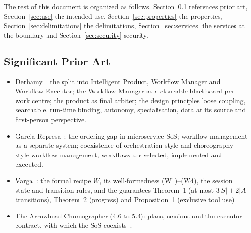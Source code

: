 \documentclass[a4paper]{arrowhead}
\begin{document}
The rest of this document is organized as follows. Section~\ref{sec:prior_art} references prior art,
Section~\ref{sec:use} the intended use, Section~\ref{sec:properties} the properties, Section~\ref{sec:delimitations}
the delimitations, Section~\ref{sec:services} the services at the boundary and Section~\ref{sec:security} security.

\newpage
\subsection{Significant Prior Art}
\label{sec:prior_art}
\begin{itemize}
\item Derhamy~\cite{derhamy2018,derhamy2018workflow}: the split into Intelligent Product, Workflow Manager and Workflow
Executor; the Workflow Manager as a cloneable blackboard per work centre; the product as final arbiter; the design
principles loose coupling, searchable, run-time binding, autonomy, specialisation, data at its source and first-person
perspective.
\item Garcia Represa~\cite{represa2022}: the ordering gap in microservice SoS; workflow management as a separate system;
coexistence of orchestration-style and choreography-style workflow management; workflows are selected, implemented
and executed.
\item Varga~\cite{varga2026}: the formal recipe $W$, its well-formedness (W1)--(W4), the session state and transition
rules, and the guarantees Theorem~1 (at most $3|S| + 2|A|$ transitions), Theorem~2 (progress) and Proposition~1
(exclusive tool use).
\item The Arrowhead Choreographer (4.6 to 5.4): plans, sessions and the executor contract, with which the SoS
coexists~\cite{delsing2017}.
\end{itemize}
\end{document}
